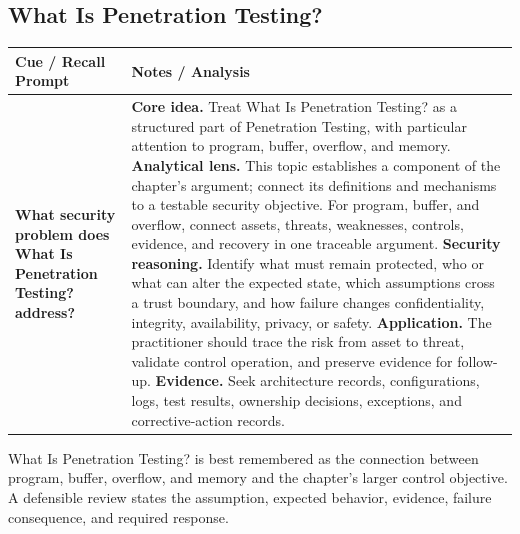 \documentclass[11pt]{article}
\newcommand{\CornellHeader}{%
\rowcolor{Navy}\color{white}\bfseries Cue / Recall Prompt & \color{white}\bfseries Notes / Analysis\\\hline}
\newcommand{\CornellRow}[2]{%
\cellcolor{CueGray}\RaggedRight\textbf{#1} & \RaggedRight #2\\\hline}
\begin{document}
\subsection*{What Is Penetration Testing?}
\begin{longtable}{>{\RaggedRight\arraybackslash}p{}|>{\RaggedRight\arraybackslash}p{}}
\CornellHeader
\CornellRow{What security problem does What Is Penetration Testing? address?}{\textbf{Core idea.} Treat What Is Penetration Testing? as a structured part of Penetration Testing, with particular attention to program, buffer, overflow, and memory. \textbf{Analytical lens.} This topic establishes a component of the chapter's argument; connect its definitions and mechanisms to a testable security objective. For program, buffer, and overflow, connect assets, threats, weaknesses, controls, evidence, and recovery in one traceable argument. \textbf{Security reasoning.} Identify what must remain protected, who or what can alter the expected state, which assumptions cross a trust boundary, and how failure changes confidentiality, integrity, availability, privacy, or safety. \textbf{Application.} The practitioner should trace the risk from asset to threat, validate control operation, and preserve evidence for follow-up. \textbf{Evidence.} Seek architecture records, configurations, logs, test results, ownership decisions, exceptions, and corrective-action records.}
\end{longtable}
\begin{topicsummary}
What Is Penetration Testing? is best remembered as the connection between program, buffer, overflow, and memory and the chapter's larger control objective. A defensible review states the assumption, expected behavior, evidence, failure consequence, and required response.
\end{topicsummary}
\end{document}
